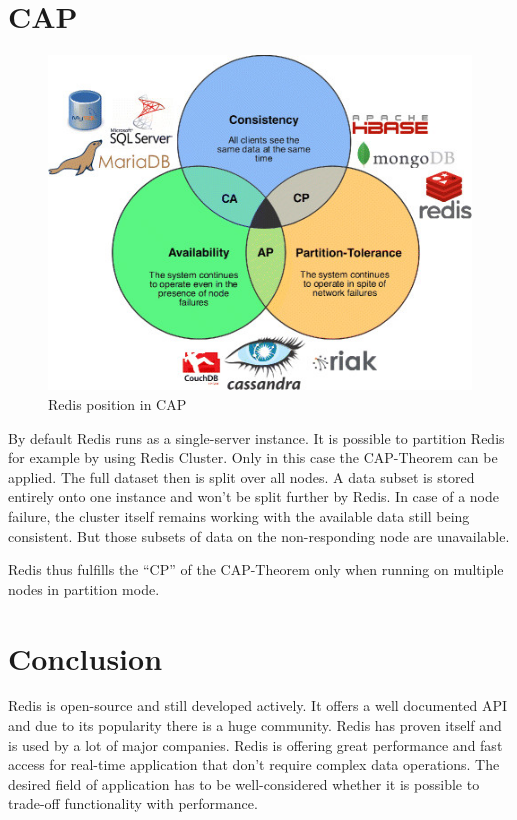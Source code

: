 \section{CAP}
\begin{figure}[h]
    \centering
    \includegraphics[width=.6\textwidth]{images/cap.png}
    \caption{Redis position in CAP}
\end{figure}
By default Redis runs as a single-server instance. It is possible to partition
Redis for example by using Redis Cluster. Only in this case the CAP-Theorem can
be applied. The full dataset then is split over all nodes. A data subset is
stored entirely onto one instance and won’t be split further by Redis. In case
of a node failure, the cluster itself remains working with the available data
still being consistent. But those subsets of data on the non-responding node are
unavailable.

Redis thus fulfills the ``CP'' of the CAP-Theorem only when running on multiple
nodes in partition mode.

\section{Conclusion}
Redis is open-source and still developed actively. It offers a well documented
API and due to its popularity there is a huge community. Redis has proven itself
and is used by a lot of major companies. Redis is offering great performance and
fast access for real-time application that don’t require complex data
operations. The desired field of application has to be well-considered whether
it is possible to trade-off functionality with performance.
